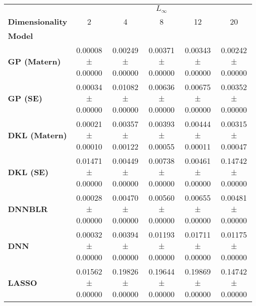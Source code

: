 \begin{tabular}{lccccc}
\toprule
{} & \multicolumn{5}{c}{$L_\infty$} \\
\textbf{Dimensionality} &                 2  &                 4  &                 8  &                 12 &                 20 \\
\textbf{Model       } &                    &                    &                    &                    &                    \\
\midrule
\textbf{GP (Matern) } &  0.00008 ± 0.00000 &  0.00249 ± 0.00000 &  0.00371 ± 0.00000 &  0.00343 ± 0.00000 &  0.00242 ± 0.00000 \\
\textbf{GP (SE)     } &  0.00034 ± 0.00000 &  0.01082 ± 0.00000 &  0.00636 ± 0.00000 &  0.00675 ± 0.00000 &  0.00352 ± 0.00000 \\
\textbf{DKL (Matern)} &  0.00021 ± 0.00010 &  0.00357 ± 0.00122 &  0.00393 ± 0.00055 &  0.00444 ± 0.00011 &  0.00315 ± 0.00047 \\
\textbf{DKL (SE)    } &  0.01471 ± 0.00000 &  0.00449 ± 0.00000 &  0.00738 ± 0.00000 &  0.00461 ± 0.00000 &  0.14742 ± 0.00000 \\
\textbf{DNNBLR      } &  0.00028 ± 0.00000 &  0.00470 ± 0.00000 &  0.00560 ± 0.00000 &  0.00655 ± 0.00000 &  0.00481 ± 0.00000 \\
\textbf{DNN         } &  0.00032 ± 0.00000 &  0.00394 ± 0.00000 &  0.01193 ± 0.00000 &  0.01711 ± 0.00000 &  0.01175 ± 0.00000 \\
\textbf{LASSO       } &  0.01562 ± 0.00000 &  0.19826 ± 0.00000 &  0.19644 ± 0.00000 &  0.19869 ± 0.00000 &  0.14742 ± 0.00000 \\
\bottomrule
\end{tabular}

